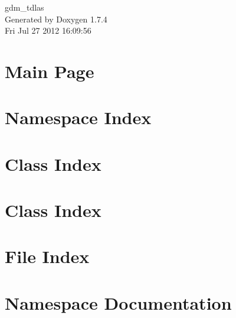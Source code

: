 \documentclass[a4paper]{book}
\begin{document}
\begin{titlepage}
\vspace*{7cm}
\begin{center}
{\Large gdm\_\-tdlas }\\
\vspace*{1cm}
{\large Generated by Doxygen 1.7.4}\\
\vspace*{0.5cm}
{\small Fri Jul 27 2012 16:09:56}\\
\end{center}
\end{titlepage}
\clearemptydoublepage
{}
\tableofcontents
\clearemptydoublepage
{}
\chapter{Main Page}
\label{index}
\chapter{Namespace Index}

\chapter{Class Index}

\chapter{Class Index}

\chapter{File Index}

\chapter{Namespace Documentation}






\end{document}
